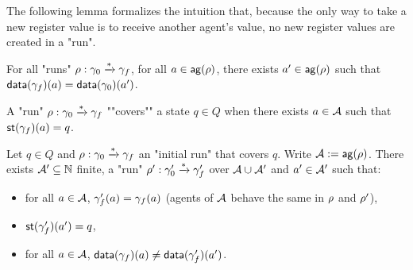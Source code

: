 The following lemma formalizes the intuition that, because the only way to take a new register value is to receive another agent's value, no new register values are created in a "run".
\begin{lemma}
\label{lem:run_no_new_register_values}
For all "runs" $\rho: \gamma_0 \xrightarrow{*} \gamma_f$, for all $a \in \mathsf{ag}(\rho)$, there exists $a' \in \mathsf{ag}(\rho)$ such that $\mathsf{data}(\gamma_f)(a) = \mathsf{data}(\gamma_0)(a')$.  
\end{lemma}


A "run" $\rho: \gamma_0 \xrightarrow{*} \gamma_f$ ""covers"" a state $q \in Q$ when there exists $a \in \mathcal{A}$ such that $\mathsf{st}(\gamma_f)(a) = q$. 



\begin{lemma}[Copycat]\label{lem:copycat}
Let $q \in Q$ and  $\rho : \gamma_0 \xrightarrow{*} \gamma_f$ an "initial run"  that covers $q$. Write $\mathcal{A} := \mathsf{ag}(\rho)$. There exists $\mathcal{A}' \subseteq \mathbb{N}$ finite, a "run" $\rho': \gamma_0' \xrightarrow{*} \gamma_f'$ over $\mathcal{A} \cup \mathcal{A}'$ and $a' \in \mathcal{A}'$ such that:
\begin{itemize}
\item for all $a \in \mathcal{A}$, $\gamma_f'(a) = \gamma_f(a)$ (agents of $\mathcal{A}$ behave the same in $\rho$ and $\rho'$),
\item $\mathsf{st}(\gamma_f')(a') = q$,
\item for all $a \in \mathcal{A}$, $\mathsf{data}(\gamma_f)(a) \ne \mathsf{data}(\gamma_f')(a')$.
\end{itemize}
		
	
	
	
\end{lemma}

